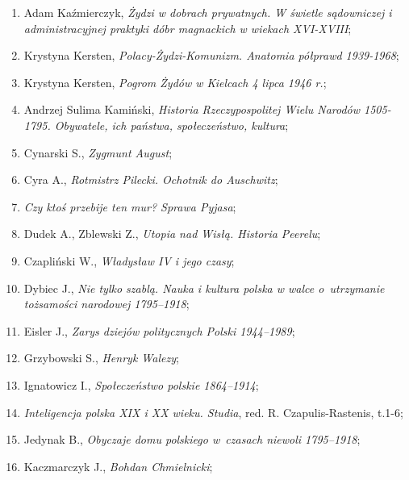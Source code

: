 \documentclass[a4paper,11pt]{article}
\begin{document}
\begin{enumerate}
\item Adam Kaźmierczyk, \textit{Żydzi w dobrach prywatnych. W świetle
    sądowniczej i administracyjnej praktyki dóbr magnackich w wiekach
    XVI-XVIII};

\item Krystyna Kersten, \textit{Polacy-Żydzi-Komunizm. Anatomia półprawd
    1939-1968};

\item Krystyna Kersten, \textit{Pogrom Żydów w Kielcach 4 lipca 1946
    r.};

\item Andrzej Sulima Kamiński, \textit{Historia Rzeczypospolitej Wielu
    Narodów 1505-1795. Obywatele, ich państwa, społeczeństwo,
    kultura};

\item Cynarski S., \textit{Zygmunt August};

\item Cyra A., \textit{Rotmistrz Pilecki. Ochotnik do Auschwitz};

\item \textit{Czy ktoś przebije ten mur? Sprawa Pyjasa};

\item Dudek A., Zblewski Z., \textit{Utopia nad Wisłą. Historia
    Peerelu};

\item Czapliński W., \textit{Władysław IV i jego czasy};

\item Dybiec J., \textit{Nie tylko szablą. Nauka i kultura polska w
    walce o~utrzymanie tożsamości narodowej 1795--1918};

\item Eisler J., \textit{Zarys dziejów politycznych Polski 1944--1989};

\item Grzybowski S., \textit{Henryk Walezy};

\item Ignatowicz I., \textit{Społeczeństwo polskie 1864--1914};

\item \textit{Inteligencja polska XIX i XX wieku. Studia}, red. R.
  Czapulis-Rastenis, t.1-6;

\item Jedynak B., \textit{Obyczaje domu polskiego w~czasach niewoli
    1795--1918};

\item Kaczmarczyk J., \textit{Bohdan Chmielnicki};


\end{enumerate}
\end{document}
